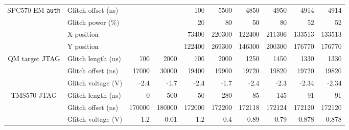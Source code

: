 \documentclass[10pt]{article}
\newcommand{\TI}{TMS570\xspace}
\newcommand{\ST}{SPC570\xspace}
\newcommand{\NXP}{QM target\xspace}
\newcommand{\auth}{\texttt{auth}\xspace}
\newcommand{\jtag}{JTAG\xspace}
\begin{document}
\begin{appendices}
\begin{table}[H]
\begin{tabular}{ll rr rr rr rr}
    \midrule

    \multicolumn{1}{c}{\multirow{3}{*}{ \parbox{2cm}{\ST EM \auth}}}
      & Glitch offset (ns)   
      &           &        
      &  100      &  5500   
      &  4850     &  4950
      &  4914     &  4914 
      \\
      \cmidrule(l){2-10}
      & Glitch power (\%)    
      &         &          
      & 20      &   80
      & 50      &   80 
      & 52      &   52 
      \\
      \cmidrule(l){2-10}
      & X position   
      &        &    
      & 73400   & 220300   %
      & 122400  & 211306   %
      & 133513  & 133513     
      \\
      \cmidrule(l){2-10}
      & Y position   
      &         &   
      & 122400  & 269300   %
      & 146300  & 200300   %
      & 176770  & 176770     
      \\


    \midrule

    \multicolumn{1}{c}{\multirow{3}{*}{ \parbox{2cm}{\NXP \jtag}}}
      & Glitch length (ns)   
      & 700     & 2000     
      & 700     & 2000     
      & 1250    & 1450     
      & 1330    & 1330     
      \\
      \cmidrule(l){2-10}
      & Glitch offset (ns)   
      & 17000   & 30000    
      & 19400   & 19900    
      & 19720   & 19820    
      & 19720   & 19820      
      \\
      \cmidrule(l){2-10}
      & Glitch voltage (V) 
      & -2.4    & -1.7     
      & -2.4    & -1.7     
      & -2.4    & -2.3     
      & -2.34   & -2.34      
      \\


    \midrule

    \multicolumn{1}{c}{\multirow{3}{*}{ \parbox{2cm}{\TI \jtag }}}
      & Glitch length (ns)   
      & 0       & 500      
      & 50      & 280      
      & 85      & 145      
      & 91      & 91         
      \\
      \cmidrule(l){2-10}
      & Glitch offset (ns)   
      & 170000  & 180000   
      & 172000  & 172200   
      & 172118  & 172124   
      & 172120  & 172120     
      \\
      \cmidrule(l){2-10}
  
      & Glitch voltage (V) 
      & -1.2    & -0.01    
      & -1.2    & -0.4     
      & -0.89   & -0.79    
      & -0.878  & -0.878     
      \\


\end{tabular}
\end{table}
\end{appendices}
\end{document}
